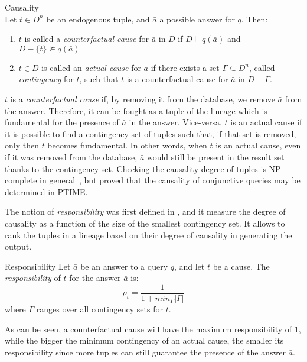 \begin{definition}{Causality \cite{MeliouGMS11} }\\
	Let $t \in D^n$ be an endogenous tuple, and $\bar{a}$ a possible answer for $q$. Then:
	\begin{enumerate}
		\item $t$ is called a \emph{counterfactual cause} for $\bar{a}$ in $D$ if $D \vDash q(\bar{a})$ and $D - \{t\} \nvDash q(\bar{a})$
		\item $t \in D$ is called an \emph{actual cause} for $\bar{a}$ if there exists a set $\Gamma \subseteq D^n$, called \emph{contingency} for $t$, such that $t$ is a counterfactual cause for $\bar{a}$ in $D - \Gamma$.
	\end{enumerate}
\end{definition}

$t$ is a \emph{counterfactual cause} if, by removing it from the database, we remove $\bar{a}$ from the answer. Therefore, it can be fought as a tuple of the lineage which is fundamental for the presence of $\bar{a}$ in the answer.
Vice-versa, $t$ is an actual cause if it is possible to find a contingency set of tuples such that, if that set is removed, only then $t$ becomes fundamental. In other words, when $t$ is an actual cause, even if it was removed from the database, $\bar{a}$ would still be present in the result set thanks to the contingency set. 
Checking the causality degree of tuples is NP-complete in general~\cite{EiterL02}, but \citet{MeliouGMS11} proved that the causality of conjunctive queries may be determined in PTIME.


The notion of \emph{responsibility} was first defined in \cite{ChocklerH04}, and it measure the degree of causality as a function of the size of the smallest contingency set. It allows to rank the tuples in a lineage based on their degree of causality in generating the output. 

\begin{definition}{Responsibility \cite{MeliouGMS11}}
	Let $\bar{a}$ be an answer to a query $q$, and let $t$ be a cause. The \emph{responsibility} of $t$ for the answer $\bar{a}$ is:
	\[
		\rho_t = \frac{1}{1 + min_\Gamma|\Gamma|}
	\]
	where $\Gamma$ ranges over all contingency sets for $t$.
\end{definition}

As can be seen, a counterfactual cause will have the maximum responsibility of $1$, while the bigger the minimum contingency of an actual cause, the smaller its responsibility since more tuples can still guarantee the presence of the answer $\bar{a}$.

